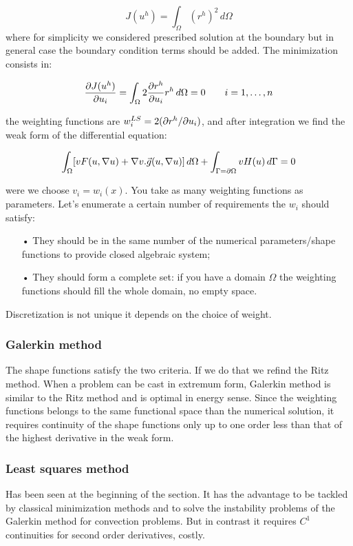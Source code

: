 \begin{equation}
J(u^h) = \int _\Omega (r^h)^2 \, d\Omega
\end{equation}
 where for simplicity we considered prescribed solution at the boundary but in general case the boundary condition terms should be added. The minimization consists in: 
 
 \begin{equation}
 \frac{\partial J(u^h)}{\partial u_i} = \int _\Omega 2\frac{\partial r^h}{\partial u_i}r^h \, d\Omega = 0 \qquad i = 1,\dots , n
 \end{equation}

the weighting functions are $w_i^{LS} = 2(\partial r^h / \partial u_i)$, and after integration we find the weak form of the differential equation:

\begin{equation}
\int _\Omega [v F(u, \nabla u) + \nabla v . \vec{g} (u,\nabla u) ] \, d\Omega + \int _{\Gamma = \partial \Omega} vH(u) \, d\Gamma = 0
\end{equation}

were we choose $v_i = w_i(x)$. You take as many weighting functions as parameters. Let's enumerate a certain number of requirements the $w_i$ should satisfy: 

\begin{itemize}
\item[•] They should be in the same number of the numerical parameters/shape functions to provide closed algebraic system;
\item[•] They should form a complete set: if you have a domain $\Omega$ the weighting functions should fill the whole domain, no empty space. 
\end{itemize}

Discretization is not unique it depends on the choice of weight. 

\subsubsection{Galerkin method}
The shape functions satisfy the two criteria. If we do that we refind the Ritz method. When a problem can be cast in extremum form, Galerkin method is similar to the Ritz method and is optimal in energy sense. Since the weighting functions belongs to the same functional space than the numerical solution, it requires continuity of the shape functions only up to one order less than that of the highest derivative in the weak form.

\subsubsection{Least squares method}
Has been seen at the beginning of the section. It has the advantage to be tackled by classical minimization methods and to solve the instability problems of the Galerkin method for convection problems. But in contrast it requires $C^1$ continuities for second order derivatives, costly. 

